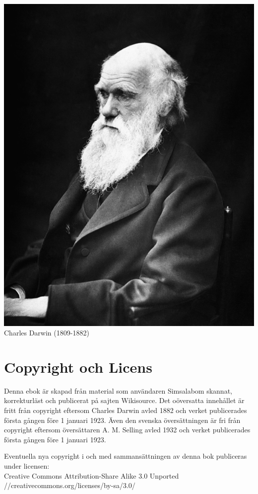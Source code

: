 \documentclass[a5paper]{book}
\begin{document}
\begin{titlepage}
\begin{center}
\includegraphics[width=\textwidth]{bilder/Charles_Darwin_01}
Charles Darwin (1809-1882)
\end{center}
\end{titlepage}

\tableofcontents
















\appendix
\chapter{Copyright och Licens}
Denna ebok är skapad från material som användaren Simsalabom skannat, korrekturläst och publicerat på sajten 
Wikisource. Det oöversatta innehållet är fritt från copyright eftersom Charles Darwin avled 1882 och verket publicerades första gången före 1 januari 1923. Även den svenska översättningen är fri från copyright eftersom översättaren A. M. Selling avled 1932 och verket publicerades första gången före 1 januari 1923.

Eventuella nya copyright i och med sammansättningen av denna bok publiceras under licensen: \\[0.5cm]
Creative Commons Attribution-Share Alike 3.0 Unported \\
//creativecommons.org/licenses/by-sa/3.0/
\end{document}
